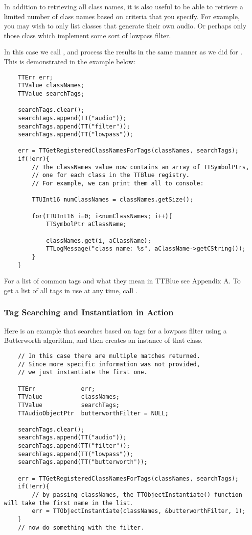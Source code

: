 In addition to retrieving all class names, it is also useful to be able to retrieve a limited number of class names based on criteria that you specify.  For example, you may wish to only list classes that generate their own audio.  Or perhaps only those class which implement some sort of lowpass filter.

In this case we call , and process the results in the same manner as we did for .  This is demonstrated in the example below:

\begin{lstlisting}
	TTErr err;
	TTValue classNames;
	TTValue searchTags;

	searchTags.clear();
	searchTags.append(TT("audio"));
	searchTags.append(TT("filter"));
	searchTags.append(TT("lowpass"));

	err = TTGetRegisteredClassNamesForTags(classNames, searchTags);
	if(!err){
		// The classNames value now contains an array of TTSymbolPtrs, 
		// one for each class in the TTBlue registry.
		// For example, we can print them all to console:

		TTUInt16 numClassNames = classNames.getSize();

		for(TTUInt16 i=0; i<numClassNames; i++){
			TTSymbolPtr aClassName;

			classNames.get(i, aClassName);
			TTLogMessage("class name: %s", aClassName->getCString());
		}
	}
\end{lstlisting}

For a list of common tags and what they mean in TTBlue see Appendix A.  To get a list of all tags in use at any time, call .


\subsubsection{Tag Searching and Instantiation in Action}

Here is an example that searches based on tags for a lowpass filter using a Butterworth algorithm, and then creates an instance of that class.

\begin{lstlisting}
	// In this case there are multiple matches returned. 
	// Since more specific information was not provided, 
	// we just instantiate the first one.
	
	TTErr             err;
	TTValue           classNames;
	TTValue           searchTags;
	TTAudioObjectPtr  butterworthFilter = NULL;
	
	searchTags.clear();
	searchTags.append(TT("audio"));
	searchTags.append(TT("filter"));
	searchTags.append(TT("lowpass"));
	searchTags.append(TT("butterworth"));
	
	err = TTGetRegisteredClassNamesForTags(classNames, searchTags);
	if(!err){
		// by passing classNames, the TTObjectInstantiate() function will take the first name in the list.
		err = TTObjectInstantiate(classNames, &butterworthFilter, 1);
	}
	// now do something with the filter.
\end{lstlisting}



